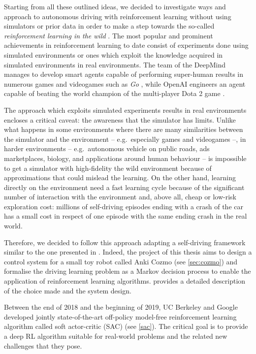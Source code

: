 Starting from all these outlined ideas, we decided to investigate ways and approach to autonomous driving with reinforcement learning without using simulators or prior data in order to make a step towards the so-called \textit{reinforcement learning in the wild} \cite{chara2018wild}. The most popular and prominent achievements in reinforcement learning to date consist of experiments done using simulated environments or ones which exploit the knowledge acquired in simulated environments in real environments. 
The team of the DeepMind manages to develop smart agents capable of performing super-human results in numerous games and videogames such as \textit{Go} \cite{silver2016mastering,silver2017mastering}, while OpenAI engineers an agent capable of beating the world champion of the multi-player Dota 2 game \cite{openai2018dota,openai2019dota}. 

The approach which exploits simulated experiments results in real environments encloses a critical caveat: the awareness that the simulator has limits.
Unlike what happens in some environments where there are many similarities between the simulator and the environment -- e.g.\ especially games and videogames --, in harder environments -- e.g.\ autonomous vehicle on public roads, ads marketplaces, biology, and applications around human behaviour -- is impossible to get a simulator with high-fidelity the wild environment because of approximations that could mislead the learning.
On the other hand, learning directly on the environment need a fast learning cycle because of the significant number of interaction with the environment and, above all, cheap or low-risk exploration cost: millions of self-driving episodes ending with a crash of the car has a small cost in respect of one episode with the same ending crash in the real world.

Therefore, we decided to follow this approach adapting a self-driving framework similar to the one presented in \cite{kendall2019learning}. Indeed, the project of this thesis aims to design a control system for a small toy robot called Anki Cozmo (see \vref{sec:cozmo}) and formalise the driving learning problem as a Markov decision process to enable the application of reinforcement learning algorithms.  provides a detailed description of the choice made and the system design.

Between the end of 2018 and the beginning of 2019, UC Berkeley and Google developed jointly state-of-the-art off-policy model-free reinforcement learning algorithm called soft actor-critic (SAC) (see \vref{sac}). The critical goal is to provide a deep RL algorithm suitable for real-world problems and the related new challenges that they pose.

